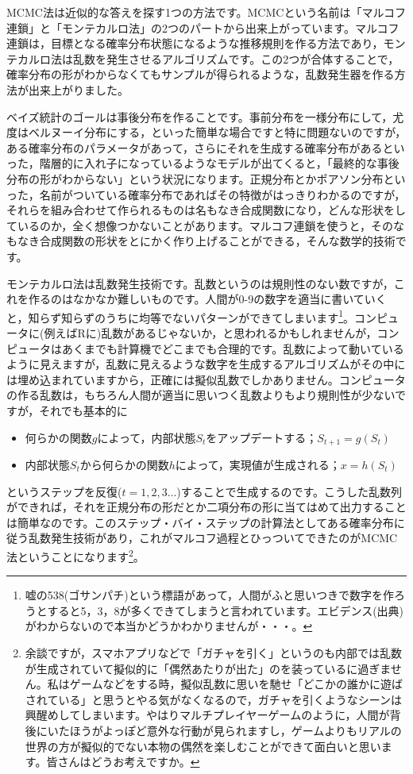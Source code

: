\documentclass{ltjsbook}
\begin{document}
MCMC法は近似的な答えを探す1つの方法です。MCMCという名前は「マルコフ連鎖」と「モンテカルロ法」の2つのパートから出来上がっています。マルコフ連鎖は，目標となる確率分布状態になるような推移規則を作る方法であり，モンテカルロ法は乱数を発生させるアルゴリズムです。この2つが合体することで，確率分布の形がわからなくてもサンプルが得られるような，乱数発生器を作る方法が出来上がりました。

ベイズ統計のゴールは事後分布を作ることです。事前分布を一様分布にして，尤度はベルヌーイ分布にする，といった簡単な場合ですと特に問題ないのですが，ある確率分布のパラメータがあって，さらにそれを生成する確率分布があるといった，階層的に入れ子になっているようなモデルが出てくると，「最終的な事後分布の形がわからない」という状況になります。正規分布とかポアソン分布といった，名前がついている確率分布であればその特徴がはっきりわかるのですが，それらを組み合わせて作られるものは名もなき合成関数になり，どんな形状をしているのか，全く想像つかないことがあります。マルコフ連鎖を使うと，そのなもなき合成関数の形状をとにかく作り上げることができる，そんな数学的技術です。

モンテカルロ法は乱数発生技術です。乱数というのは規則性のない数ですが，これを作るのはなかなか難しいものです。人間が0-9の数字を適当に書いていくと，知らず知らずのうちに均等でないパターンができてしまいます\footnote{嘘の538(ゴサンパチ)という標語があって，人間がふと思いつきで数字を作ろうとすると5，3，8が多くできてしまうと言われています。エビデンス(出典)がわからないので本当かどうかわかりませんが・・・。}。コンピュータに(例えばRに)乱数があるじゃないか，と思われるかもしれませんが，コンピュータはあくまでも計算機でどこまでも合理的です。乱数によって動いているように見えますが，乱数に見えるような数字を生成するアルゴリズムがその中には埋め込まれていますから，正確には擬似乱数でしかありません。コンピュータの作る乱数は，もちろん人間が適当に思いつく乱数よりもより規則性が少ないですが，それでも基本的に
\begin{itemize}
    \item 何らかの関数$g$によって，内部状態$S_t$をアップデートする；$S_{t+1}=g(S_t)$
    \item 内部状態$S_t$から何らかの関数$h$によって，実現値が生成される；$x = h(S_t)$
\end{itemize}
というステップを反復($t=1,2,3\ldots$)することで生成するのです。こうした乱数列ができれば，それを正規分布の形だとか二項分布の形に当てはめて出力することは簡単なのです。このステップ・バイ・ステップの計算法としてある確率分布に従う乱数発生技術があり，これがマルコフ過程とひっついてできたのがMCMC法ということになります\footnote{余談ですが，スマホアプリなどで「ガチャを引く」というのも内部では乱数が生成されていて擬似的に「偶然あたりが出た」のを装っているに過ぎません。私はゲームなどをする時，擬似乱数に思いを馳せ「どこかの誰かに遊ばされている」と思うとやる気がなくなるので，ガチャを引くようなシーンは興醒めしてしまいます。やはりマルチプレイヤーゲームのように，人間が背後にいたほうがよっぽど意外な行動が見られますし，ゲームよりもリアルの世界の方が擬似的でない本物の偶然を楽しむことができて面白いと思います。皆さんはどうお考えですか。}。
\end{document}
